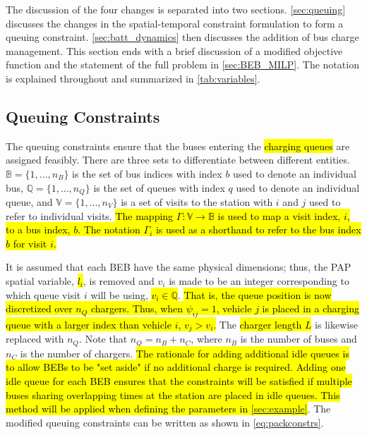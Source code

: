 \documentclass[utf8]{FrontiersinHarvard}
\begin{document}
The discussion of the four changes is separated into two sections. \autoref{sec:queuing} discusses the changes in the
spatial-temporal constraint formulation to form a queuing constraint. \autoref{sec:batt_dynamics} then discusses the
addition of bus charge management. This section ends with a brief discussion of a modified objective function and the
statement of the full problem in \autoref{sec:BEB_MILP}. The notation is explained throughout and summarized in
\autoref{tab:variables}.

\subsection{Queuing Constraints}
\label{sec:queuing}
\noindent The queuing constraints ensure that the buses entering the \hl{charging queues} are assigned
feasibly. There are three sets to differentiate between different entities. \(\mathbb{B} = \{1, ..., n_B\}\) is the set of
bus indices with index \(b\) used to denote an individual bus, \(\mathbb{Q} = \{1, ..., n_Q\}\) is the set of queues with index \(q\)
used to denote an individual queue, and \(\mathbb{V} = \{1, ..., n_V\}\) is a set of visits to the station with \(i\) and
\(j\) used to refer to individual visits. \hl{The mapping $\Gamma: \mathbb{V} \rightarrow \mathbb{B}$ is used to map a visit index, $i$, to a bus index, $b$. The notation $\Gamma_i$ is used as a shorthand to refer to the bus index $b$ for visit $i$.}

It is assumed that each BEB have the same physical dimensions; thus, the PAP spatial variable, \hl{$l_i$}, is removed
and \(v_i\) is made to be an integer corresponding to which queue visit \(i\) will be using, \hl{$v_i \in \mathbb{Q}$}.
\hl{That is, the queue position is now discretized over $n_Q$ chargers. Thus, when $\psi_{ij} = 1$, vehicle $j$ is placed in a charging queue with a larger index than vehicle $i$, $v_j > v_i$.} The \hl{charger length $L$} is
likewise replaced with \(n_Q\). Note that \(n_Q = n_B + n_C\), where \(n_B\) is the number of buses and \(n_C\) is the number of
chargers. \hl{The rationale for adding additional idle queues is to allow BEBs to be "set aside" if no additional charge is required. Adding one idle queue for each BEB ensures that the constraints will be satisfied if multiple buses sharing overlapping times at the station are placed in idle queues. This method will be applied when defining the parameters in {\autoref{sec:example}}}. The modified queuing constraints can be written as shown in
\autoref{eq:packconstrs}.
\end{document}
